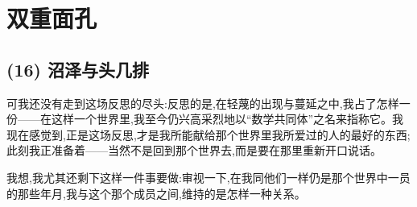 \chapter{双重面孔}

\section{(16) 沼泽与头几排}

可我还没有走到这场反思的尽头:反思的是,在轻蔑的出现与蔓延之中,我占了怎样一份——在这样一个世界里,我至今仍兴高采烈地以“数学共同体”之名来指称它。我现在感觉到,正是这场反思,才是我所能献给那个世界里我所爱过的人的最好的东西;此刻我正准备着——当然不是回到那个世界去,而是要在那里重新开口说话。

我想,我尤其还剩下这样一件事要做:审视一下,在我同他们一样仍是那个世界中一员的那些年月,我与这个那个成员之间,维持的是怎样一种关系。

